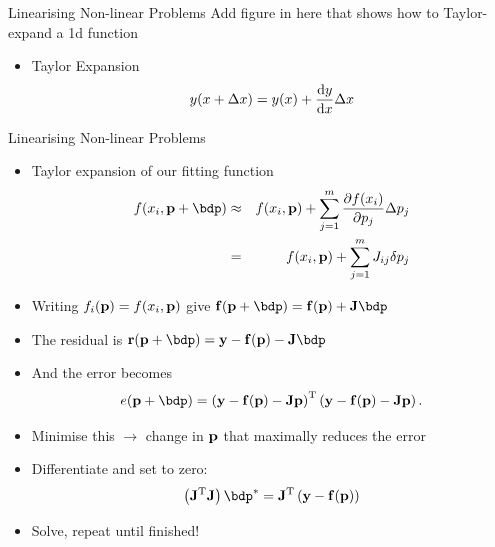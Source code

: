 \documentclass{beamer}
\begin{document}
\begin{frame}{Linearising Non-linear Problems}
  Add figure in here that shows how to Taylor-expand a 1d function
  \begin{itemize}
  \item Taylor Expansion
    \begin{equation*}
      y(x+\Delta x) = y(x) + \frac{\mathrm{d} y}{\mathrm{d} x}\Delta x
    \end{equation*}
  \end{itemize}
\end{frame}

\begin{frame}{Linearising Non-linear Problems}
  \begin{itemize}
    \item Taylor expansion of our fitting function
      \begin{eqnarray*}
        f(x_i,\bp+\bdp) &\approx& f(x_i,\bp) + \sum_{j=1}^m \frac{\partial f(x_i)}{\partial p_j}\Delta p_j\\
        &=& f(x_i,\bp) + \sum_{j=1}^m J_{ij}\delta p_j
      \end{eqnarray*}
      \item Writing $f_i(\mathbf{p}) = f(x_i,\mathbf{p})$ give $\bf(\bp+\bdp)=\bf(\bp)+\bJ\bdp$ 
      \item The residual is $\br(\bp+\bdp) = \by - \bf(\bp) -\bJ\bdp$
      \item And the error becomes
        \begin{equation*}
          e(\bp+\bdp) = \left(\by - \bf(\bp) -\bJ\bp\right)^\rT\left(\by - \bf(\bp) -\bJ\bp\right).
        \end{equation*}
      \item Minimise this $\rightarrow$ change in $\mathbf{p}$ that maximally reduces the error
      \item Differentiate and set to zero:
        \begin{equation*}
          \left(\bJ^\rT\bJ\right)\bdp^* = \bJ^\rT\left(\by-\bf(\bp)\right)
        \end{equation*}
      \item Solve, repeat until finished!
  \end{itemize}
\end{frame}
\end{document}
